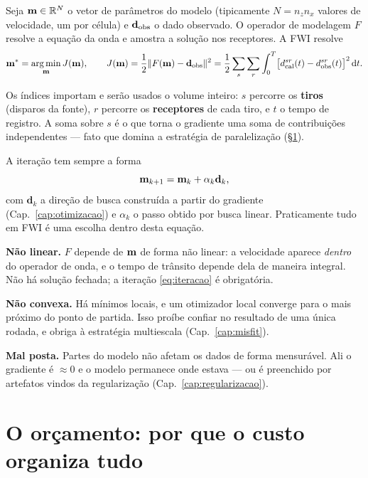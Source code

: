 \documentclass[11pt,a4paper,oneside]{report}
\begin{document}
Seja $\mathbf{m} \in \mathbb{R}^{N}$ o vetor de par\^ametros do modelo (tipicamente
$N = n_z n_x$ valores de velocidade, um por c\'elula) e $\mathbf{d}_{\mathrm{obs}}$ o dado
observado. O operador de modelagem $F$ resolve a equa\c{c}\~ao da onda e
amostra a solu\c{c}\~ao nos receptores. A FWI resolve
\begin{equation}
\mathbf{m}^{*} = \operatorname*{arg\,min}_{\mathbf{m}} J(\mathbf{m}),
\qquad
J(\mathbf{m}) = \frac{1}{2}\lVert F(\mathbf{m}) - \mathbf{d}_{\mathrm{obs}} \rVert^{2}
 = \frac{1}{2}\sum_{s}\sum_{r}\int_{0}^{T}
   \bigl[d_{\text{cal}}^{sr}(t) - d_{\text{obs}}^{sr}(t)\bigr]^{2} \,\mathrm{d} t .
\label{eq:J}
\end{equation}

Os \'indices importam e ser\~ao usados o volume inteiro: $s$ percorre os
\textbf{tiros} (disparos da fonte), $r$ percorre os \textbf{receptores} de
cada tiro, e $t$ o tempo de registro. A soma sobre $s$ \'e o que torna o
gradiente uma soma de contribui\c{c}\~oes independentes --- fato que
domina a estrat\'egia de paraleliza\c{c}\~ao (§\ref{sec:custo}).

A itera\c{c}\~ao tem sempre a forma
\begin{equation}
\mathbf{m}_{k+1} = \mathbf{m}_{k} + \alpha_k \mathbf{d}_k ,
\label{eq:iteracao}
\end{equation}
com $\mathbf{d}_k$ a dire\c{c}\~ao de busca constru\'ida a partir do
gradiente (Cap.~\ref{cap:otimizacao}) e $\alpha_k$ o passo obtido por busca
linear. Praticamente tudo em FWI \'e uma escolha dentro desta equa\c{c}\~ao.

\begin{teoria}
\textbf{N\~ao linear.} $F$ depende de $\mathbf{m}$ de forma n\~ao linear: a
velocidade aparece \emph{dentro} do operador de onda, e o tempo de tr\^ansito
depende dela de maneira integral. N\~ao h\'a solu\c{c}\~ao fechada; a
itera\c{c}\~ao \eqref{eq:iteracao} \'e obrigat\'oria.

\textbf{N\~ao convexa.} H\'a m\'inimos locais, e um otimizador local converge
para o mais pr\'oximo do ponto de partida. Isso pro\'ibe confiar no resultado
de uma \'unica rodada, e obriga \`a estrat\'egia multiescala
(Cap.~\ref{cap:misfit}).

\textbf{Mal posta.} Partes do modelo n\~ao afetam os dados de forma
mensur\'avel. Ali o gradiente \'e $\approx 0$ e o modelo permanece onde
estava --- ou \'e preenchido por artefatos vindos da regulariza\c{c}\~ao
(Cap.~\ref{cap:regularizacao}).
\end{teoria}

\section{O or\c{c}amento: por que o custo organiza tudo}
\label{sec:custo}
\end{document}
